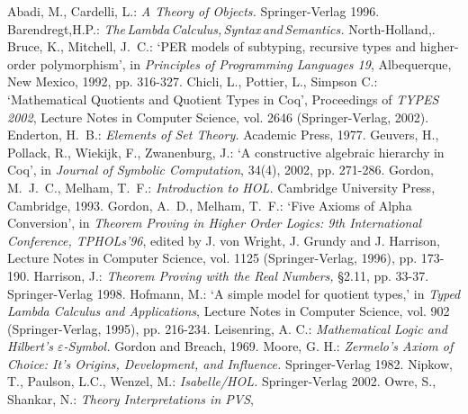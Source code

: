 \documentclass[envcountsame,runningheads]{llncs}
\begin{document}
%
%
\begin{thebibliography}{5}
%
Abadi, M., Cardelli, L.:
{\it A Theory of Objects.}
Springer-Verlag 1996.
%
Barendregt,\:H.P.:
{\it The\,Lambda\,Calculus,\,Syntax\,and\,Semantics.}
North-Holland,.
%
Bruce, K., Mitchell, J.~C.:
`PER models of subtyping, recursive types and higher-order polymorphism', in
{\it Principles of Programming Languages 19},
Albequerque, New Mexico, 1992, pp. 316-327.
%
Chicli, L., Pottier, L., Simpson C.:
`Mathematical Quotients and Quotient Types in Coq',
Proceedings of {\it TYPES 2002},
Lecture Notes in Computer Science, vol. 2646
(Springer-Verlag, 2002).
%
Enderton, H.~B.:
{\it Elements of Set Theory.}
Academic Press, 1977.
%
Geuvers, H., Pollack, R., Wiekijk, F., Zwanenburg, J.:
`A constructive algebraic hierarchy in Coq', in
{\it Journal of Symbolic Computation}, 34(4), 2002, pp. 271-286.
%
Gordon, M.~J.~C., Melham, T.~F.:
{\it Introduction to HOL.}
Cambridge University Press, Cambridge, 1993.
%
Gordon, A.~D., Melham, T.~F.:
`Five Axioms of Alpha Conversion', in
{\it Theorem Proving in Higher Order Logics:
9th International Conference, TPHOLs'96},
edited by J. von Wright, J. Grundy and J. Harrison,
Lecture Notes in Computer Science, vol. 1125
(Springer-Verlag, 1996), pp. 173-190.
%
Harrison, J.:
{\it Theorem Proving with the Real Numbers,}
\S{2.11}, pp. 33-37.
Springer-Verlag 1998.
%
Hofmann, M.:
`A simple model for quotient types,' in
{\it Typed Lambda Calculus and Applications}, 
Lecture Notes in Computer Science, vol. 902
(Springer-Verlag, 1995), pp. 216-234.
%
%
%
Leisenring, A. C.:
{\it Mathematical Logic and Hilbert's $\varepsilon$-Symbol.}
Gordon and Breach, 1969.
%
Moore, G. H.:
{\it Zermelo's Axiom of Choice: It's Origins, Development, and Influence.}
Springer-Verlag 1982.
%
Nipkow, T., Paulson, L.C., Wenzel, M.:
{\it Isabelle/HOL.}
Springer-Verlag 2002.
%
Owre, S., Shankar, N.:
{\it Theory Interpretations in PVS},

\end{thebibliography}
\end{document}

